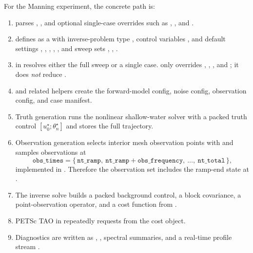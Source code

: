 \documentclass[11pt]{article}
\begin{document}
For the Manning experiment, the concrete path is:
\begin{enumerate}
\item {} parses , , and optional single-case overrides such as , , and .
\item {} defines  as a  with inverse-problem type , control variables , and default settings , , , , , and sweep sets , , .
\item {} in  resolves either the full sweep or a single case.  only overrides , , , and ; it does \emph{not} reduce .
\item {} and related helpers create the forward-model config, noise config, observation config, and case manifest.
\item Truth generation runs the nonlinear shallow-water solver with a packed truth control $[u_0^\star;\theta_n^\star]$ and stores the full trajectory.
\item Observation generation selects interior mesh observation points with  and samples observations at
\[
\texttt{obs\_times} = \{\, \texttt{nt\_ramp},\ \texttt{nt\_ramp}+\texttt{obs\_frequency},\ \ldots,\ \texttt{nt\_total}\,\},
\]
implemented in . Therefore the observation set includes the ramp-end state at .
\item The inverse solve builds a packed background control, a block covariance, a point-observation operator, and a cost function from .
\item PETSc TAO  in  repeatedly requests  from the cost object.
\item Diagnostics are written as , , spectral summaries, and a real-time profile stream .
\end{enumerate}
\end{document}
